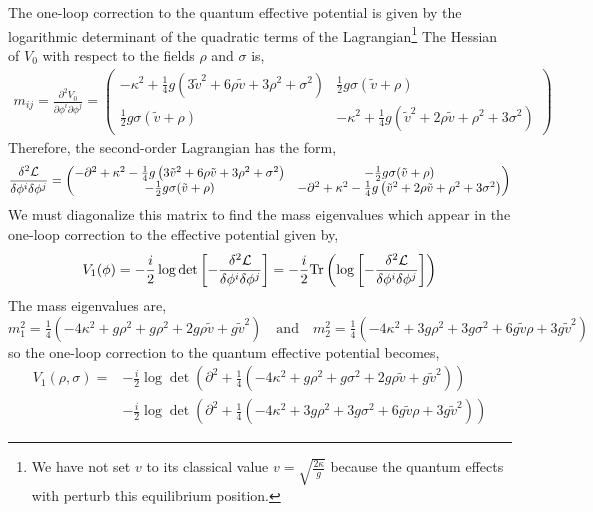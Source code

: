 \documentclass[12pt]{article}
\begin{document}
The one-loop correction to the quantum effective potential is given by the logarithmic determinant of the quadratic terms of the Lagrangian\footnote{We have not set $v$ to its classical value $v = \sqrt{\frac{2 \kappa}{g}}$ because the quantum effects with perturb this equilibrium position.} The Hessian of $V_0$ with respect to the fields $\rho$ and $\sigma$ is,
\begin{align*}
m_{ij} = \frac{\partial^2 V_0}{\partial \phi^i \partial \phi^j} = 
\begin{pmatrix}
- \kappa^2 + \tfrac{1}{4} g \left( 3 \tilde{v}^2 + 6 \rho \tilde{v} + 3 \rho^2 + \sigma^2 \right) & \tfrac{1}{2} g \sigma (\tilde{v} + \rho) 
\\
\tfrac{1}{2} g \sigma (\tilde{v} + \rho)  & - \kappa^2 + \tfrac{1}{4} g \left( \tilde{v}^2 + 2 \rho \tilde{v} + \rho^2 + 3 \sigma^2 \right)  
\end{pmatrix} 
\end{align*}
Therefore, the second-order Lagrangian has the form,
\begin{align*}
\frac{\delta^2 \mathcal{L}}{\delta \phi^i \delta \phi^j} = 
\begin{pmatrix}
- \partial^2 + \kappa^2 - \tfrac{1}{4} g \left( 3 \tilde{v}^2 + 6 \rho \tilde{v} + 3 \rho^2 + \sigma^2 \right) & -\tfrac{1}{2} g \sigma (\tilde{v} + \rho) 
\\
- \tfrac{1}{2} g \sigma (\tilde{v} + \rho)  & - \partial^2 + \kappa^2 - \tfrac{1}{4} g \left( \tilde{v}^2 + 2 \rho \tilde{v} + \rho^2 + 3 \sigma^2 \right)  
\end{pmatrix} 
\end{align*}
We must diagonalize this matrix to find the mass eigenvalues which appear in the one-loop correction to the effective potential given by,
\[ V_1(\phi) = - \frac{i}{2} \log{\det{\left[ - \frac{\delta^2 \mathcal{L}}{\delta \phi^i \delta \phi^j} \right]}} = - \frac{i}{2} \mathrm{Tr}\left( \log{\left[ - \frac{\delta^2 \mathcal{L}}{\delta \phi^i \delta \phi^j} \right]} \right)
\]
The mass eigenvalues are,
\[ m_1^2 = \tfrac{1}{4} \left( - 4 \kappa^2 + g \rho^2 + g \rho^2 + 2 g \rho \tilde{v} + g \tilde{v}^2 \right) \quad \text{and} \quad m_2^2 = \tfrac{1}{4} \left( - 4 \kappa^2 + 3 g \rho^2 + 3 g \sigma^2 + 6 g \tilde{v} \rho + 3 g \tilde{v}^2  \right) \]
so the one-loop correction to the quantum effective potential becomes,
\begin{align*}
 V_1(\rho, \sigma) = & -\tfrac{i}{2} \log{\det{\left( \partial^2 + \tfrac{1}{4} \left( - 4 \kappa^2 + g \rho^2 + g \sigma^2 + 2 g \rho \tilde{v} + g \tilde{v}^2 \right)\right)}} 
\\
& - \tfrac{i}{2} \log{\det{\left(\partial^2  +\tfrac{1}{4} \left( - 4 \kappa^2 + 3 g \rho^2 + 3 g \sigma^2 + 6 g \tilde{v} \rho + 3 g \tilde{v}^2  \right) \right)}}
\end{align*}
\end{document}
